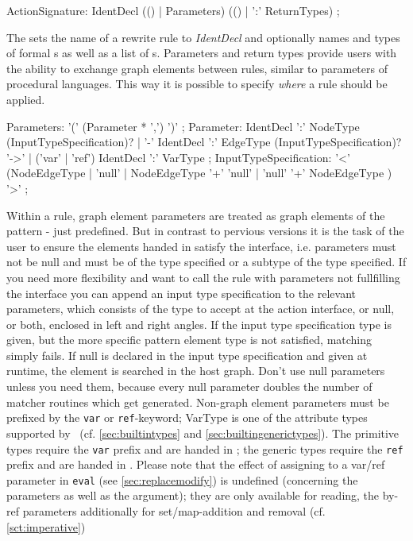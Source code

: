 \begin{rail}
  ActionSignature: IdentDecl (() | Parameters) (() | ':' ReturnTypes) ;
\end{rail}
The  sets the name of a rewrite rule to \emph{IdentDecl} and optionally names and types of formal s as well as a list of s.
Parameters and return types provide users with the ability to exchange graph elements between rules, similar to parameters of procedural languages.
This way it is possible to specify \emph{where} a rule should be applied.

\begin{rail}
  Parameters: '(' (Parameter * ',') ')' ;
  Parameter: IdentDecl ':' NodeType (InputTypeSpecification)? | '-' IdentDecl ':' EdgeType (InputTypeSpecification)? '->' | ('var' | 'ref') IdentDecl ':' VarType ;
  InputTypeSpecification: '<' (NodeEdgeType | 'null' | NodeEdgeType '+' 'null' | 'null' '+' NodeEdgeType ) '>' ;
\end{rail}

Within a rule, graph element parameters are treated as graph elements of the pattern - just predefined.
But in contrast to pervious versions it is the task of the user to ensure the elements handed in satisfy the interface, i.e. parameters must not be null and must be of the type specified or a subtype of the type specified.
If you need more flexibility and want to call the rule with parameters not fullfilling the interface you can append an input type specification to the relevant parameters, which consists of the type to accept at the action interface, or null, or both, enclosed in left and right angles.
If the input type specification type is given, but the more specific pattern element type is not satisfied, matching simply fails.
If null is declared in the input type specification and given at runtime, the element is searched in the host graph.
Don't use null parameters unless you need them, because every null parameter doubles the number of matcher routines which get generated.
Non-graph element parameters must be prefixed by the \texttt{var} or \texttt{ref}-keyword;
VarType is one of the attribute types supported by \GrG\ (cf. \ref{sec:builtintypes} and \ref{sec:builtingenerictypes}).
The primitive types require the \texttt{var} prefix and are handed in ;
the generic types require the \texttt{ref} prefix and are handed in .
Please note that the effect of assigning to a var/ref parameter in \texttt{eval} (see \ref{sec:replacemodify}) is undefined (concerning the parameters as well as the argument);
they are only available for reading, the by-ref parameters additionally for set/map-addition and removal (cf. \ref{sct:imperative})

